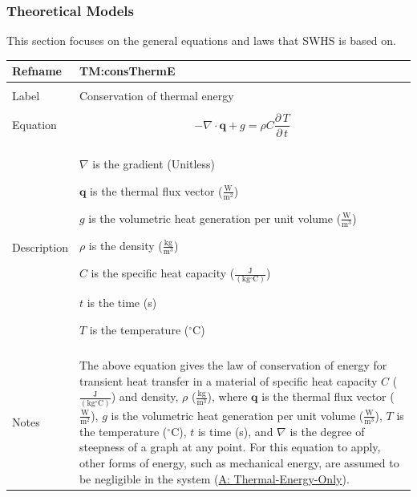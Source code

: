 \documentclass[12pt]{article}
\begin{document}
\subsubsection{Theoretical Models}
\label{Sec:TMs}
This section focuses on the general equations and laws that SWHS is based on.
~\newline
 \noindent \begin{minipage}{\textwidth}
\begin{tabular}{p{} p{}}
\toprule \textbf{Refname} & \textbf{TM:consThermE}
\label{TM:consThermE}
\\ \midrule \\
Label & Conservation of thermal energy
        \\ \midrule \\
        Equation & \begin{dmath}
                   -∇\cdot{}\mathbf{q}+g=ρ C \frac{\partial{}\,T}{\partial{}\,t}
                   \end{dmath}
                   \\ \midrule \\
                   Description & \begin{symbDescription}
                                 \item{$∇$ is the gradient (Unitless)}
                                 \item{$\mathbf{q}$ is the thermal flux vector ($\frac{\text{W}}{\text{m}^{2}}$)}
                                 \item{$g$ is the volumetric heat generation per unit volume ($\frac{\text{W}}{\text{m}^{3}}$)}
                                 \item{$ρ$ is the density ($\frac{\text{kg}}{\text{m}^{3}}$)}
                                 \item{$C$ is the specific heat capacity ($\frac{\text{J}}{(\text{kg}{}^{\circ}\text{C})}$)}
                                 \item{$t$ is the time (s)}
                                 \item{$T$ is the temperature (${}^{\circ}$C)}
                                 \end{symbDescription}
                                 \\ \midrule \\
                                 Notes & The above equation gives the law of conservation of energy for transient heat transfer in a material of specific heat capacity $C$ ($\frac{\text{J}}{(\text{kg}{}^{\circ}\text{C})}$) and density, $ρ$ ($\frac{\text{kg}}{\text{m}^{3}}$), where $\mathbf{q}$ is the thermal flux vector ($\frac{\text{W}}{\text{m}^{2}}$), $g$ is the volumetric heat generation per unit volume ($\frac{\text{W}}{\text{m}^{3}}$), $T$ is the temperature (${}^{\circ}$C), $t$ is time (s), and $∇$ is the degree of steepness of a graph at any point. For this equation to apply, other forms of energy, such as mechanical energy, are assumed to be negligible in the system (\hyperref[A:Thermal-Energy-Only]{A: Thermal-Energy-Only}).

\end{tabular}
\end{minipage}
\end{document}
